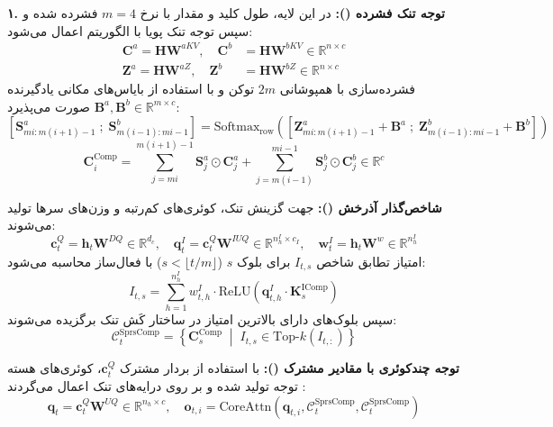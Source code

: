 \textbf{۱. توجه تنک فشرده ():}
در این لایه، طول کلید و مقدار با نرخ $m=4$ فشرده شده و سپس توجه تنک پویا با الگوریتم  \cite{deepseek2025v32} اعمال می‌شود:
\begin{align}
    \mathbf{C}^a = \mathbf{H} \mathbf{W}^{aKV}, \quad \mathbf{C}^b &= \mathbf{H} \mathbf{W}^{bKV} \in \mathbb{R}^{n \times c} \\
    \mathbf{Z}^a = \mathbf{H} \mathbf{W}^{aZ}, \quad \mathbf{Z}^b &= \mathbf{H} \mathbf{W}^{bZ} \in \mathbb{R}^{n \times c}
\end{align}
فشرده‌سازی با همپوشانی $2m$ توکن و با استفاده از بایاس‌های مکانی یادگیرنده $\mathbf{B}^a, \mathbf{B}^b \in \mathbb{R}^{m \times c}$ صورت می‌پذیرد:
\begin{equation}
    \left[\mathbf{S}_{mi:m(i+1)-1}^a \;;\; \mathbf{S}_{m(i-1):mi-1}^b\right] = \text{Softmax}_{\text{row}}\left(\left[\mathbf{Z}_{mi:m(i+1)-1}^a + \mathbf{B}^a \;;\; \mathbf{Z}_{m(i-1):mi-1}^b + \mathbf{B}^b\right]\right)
\end{equation}
\begin{equation}
    \mathbf{C}_i^{\text{Comp}} = \sum_{j=mi}^{m(i+1)-1} \mathbf{S}_j^a \odot \mathbf{C}_j^a + \sum_{j=m(i-1)}^{mi-1} \mathbf{S}_j^b \odot \mathbf{C}_j^b \in \mathbb{R}^c
\end{equation}

\textbf{شاخص‌گذار آذرخش ():}
جهت گزینش تنک، کوئری‌های کم‌رتبه و وزن‌های سرها تولید می‌شوند:
\begin{equation}
    \mathbf{c}_t^Q = \mathbf{h}_t \mathbf{W}^{DQ} \in \mathbb{R}^{d_c}, \quad \mathbf{q}_t^I = \mathbf{c}_t^Q \mathbf{W}^{IUQ} \in \mathbb{R}^{n_h^I \times c_I}, \quad \mathbf{w}_t^I = \mathbf{h}_t \mathbf{W}^w \in \mathbb{R}^{n_h^I}
\end{equation}
امتیاز تطابق شاخص $I_{t,s}$ برای بلوک $s$ ($s < \lfloor t/m \rfloor$) با فعال‌ساز  محاسبه می‌شود:
\begin{equation}
    I_{t,s} = \sum_{h=1}^{n_h^I} w_{t,h}^I \cdot \text{ReLU}\left(\mathbf{q}_{t,h}^I \cdot \mathbf{K}_s^{\text{IComp}}\right)
\end{equation}
سپس بلوک‌های دارای بالاترین امتیاز در ساختار کَش تنک برگزیده می‌شوند:
\begin{equation}
    \mathcal{C}_t^{\text{SprsComp}} = \left\{ \mathbf{C}_s^{\text{Comp}} \;\middle|\; I_{t,s} \in \text{Top-}k(I_{t,:}) \right\}
\end{equation}

\textbf{توجه چندکوئری با مقادیر مشترک ():}
با استفاده از بردار مشترک $\mathbf{c}_t^Q$، کوئری‌های هسته توجه تولید شده و بر روی درایه‌های تنک اعمال می‌گردند \cite{shazeer2019fast}:
\begin{equation}
    \mathbf{q}_t = \mathbf{c}_t^Q \mathbf{W}^{UQ} \in \mathbb{R}^{n_h \times c}, \quad \mathbf{o}_{t,i} = \text{CoreAttn}\left(\mathbf{q}_{t,i}, \mathcal{C}_t^{\text{SprsComp}}, \mathcal{C}_t^{\text{SprsComp}}\right)
\end{equation}

